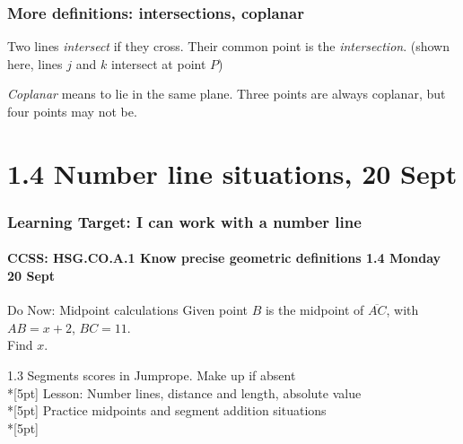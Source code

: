 \documentclass{beamer}
\begin{document}
\frame
{
\frametitle{More definitions: intersections, coplanar}
Two lines \emph{intersect} if they cross. Their common point is the \emph{intersection}. 
(shown here, lines $j$ and $k$ intersect at point $P$)
\begin{center}
  \end{center}
  \emph{Coplanar} means to lie in the same plane. Three points are always coplanar, but four points may not be. \\[0.15in]
  \begin{center}
\end{center}
}

  \section{1.4 Number line situations, 20 Sept}
  \frame
  {
    \frametitle{Learning Target: I can work with a number line}
    \framesubtitle{CCSS: HSG.CO.A.1 Know precise geometric definitions  \hfill \alert{1.4 Monday 20 Sept}}
  
    \begin{block}{Do Now: Midpoint calculations}
      Given point $B$ is the midpoint of $\overline{AC}$, with $AB=x+2$, $BC=11$. \\
      Find $x$.
        \begin{center}
        \end{center}
    \end{block}
    1.3 Segments scores in Jumprope. Make up if absent \\*[5pt]
    Lesson: Number lines, distance and length, absolute value \\*[5pt]
    Practice midpoints and segment addition situations \\*[5pt]
  }
\end{document}
